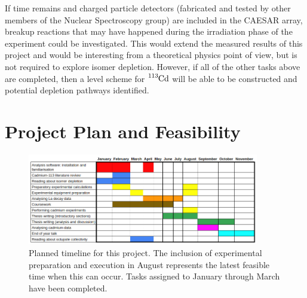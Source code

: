 \documentclass[12pt,a4paper]{article}
\begin{document}
\medskip
\noindent
If time remains and charged particle detectors (fabricated and tested by other members of the Nuclear Spectroscopy group) are included in the CAESAR array, breakup reactions that may have happened during the irradiation phase of the experiment could be investigated.
This would extend the measured results of this project and would be interesting from a theoretical physics point of view, but is not required to explore isomer depletion.
However, if all of the other tasks above are completed, then a level scheme for $\ce{^{113}Cd}$ will be able to be constructed and potential depletion pathways identified. 


\section*{Project Plan and Feasibility}
\begin{figure}[htbp]
	\centering
	\includegraphics[width=0.9\textwidth]{GanttRP}
	\caption{Planned timeline for this project. The inclusion of experimental preparation and execution in August represents the latest feasible time when this can occur. Tasks assigned to January through March have been completed.}
\label{fig:gantt}
\end{figure}
\end{document}

